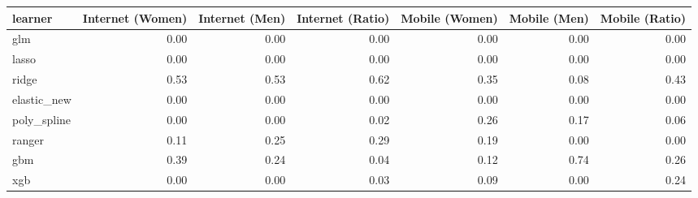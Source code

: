 \begin{table}[ht]
\centering
\begin{tabular}{lrrrrrr}
  \toprule
learner & Internet (Women) & Internet (Men) & Internet (Ratio) & Mobile (Women) & Mobile (Men) & Mobile (Ratio) \\ 
  \midrule
glm & 0.00 & 0.00 & 0.00 & 0.00 & 0.00 & 0.00 \\ 
  lasso & 0.00 & 0.00 & 0.00 & 0.00 & 0.00 & 0.00 \\ 
  ridge & 0.53 & 0.53 & 0.62 & 0.35 & 0.08 & 0.43 \\ 
  elastic\_new & 0.00 & 0.00 & 0.00 & 0.00 & 0.00 & 0.00 \\ 
  poly\_spline & 0.00 & 0.00 & 0.02 & 0.26 & 0.17 & 0.06 \\ 
  ranger & 0.11 & 0.25 & 0.29 & 0.19 & 0.00 & 0.00 \\ 
  gbm & 0.39 & 0.24 & 0.04 & 0.12 & 0.74 & 0.26 \\ 
  xgb & 0.00 & 0.00 & 0.03 & 0.09 & 0.00 & 0.24 \\ 
   \bottomrule
\end{tabular}
\end{table}
